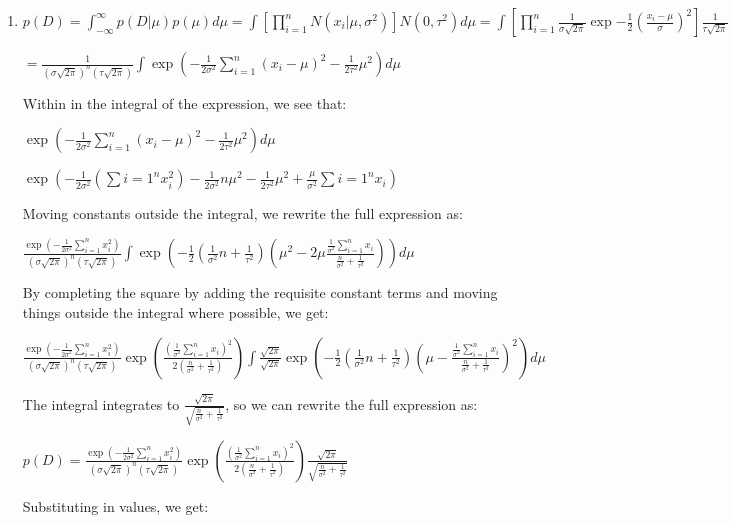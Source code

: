 \documentclass[submit]{harvardml}
\begin{document}
\begin{enumerate}
    \item 
    
    $p(D) = \int_{-\infty}^{\infty} p(D|\mu)p(\mu) d\mu = \int [\prod_{i=1}^n N(x_i | \mu, \sigma^2)]N(0, \tau^2)d\mu = \int[\prod_{i=1}^n \frac{1}{\sigma\sqrt{2\pi}}\exp{-\frac{1}{2}(\frac{x_i-\mu}{\sigma})^2}] \frac{1}{\tau\sqrt{2\pi}} \exp{-\frac{1}{2}(\frac{\mu}{\tau})^2}d\mu$
    
    $= \frac{1}{(\sigma\sqrt{2\pi})^n(\tau\sqrt{2\pi})}\int \exp(-\frac{1}{2\sigma^2}\sum_{i=1}^n (x_i - \mu)^2 - \frac{1}{2\tau^2}\mu^2)d\mu$
    
    Within in the integral of the expression, we see that:
    
    $\exp(-\frac{1}{2\sigma^2}\sum_{i=1}^n (x_i - \mu)^2 - \frac{1}{2\tau^2}\mu^2)d\mu $
    
    $\exp(-\frac{1}{2\sigma^2}(\sum{i=1}^n x_i^2) - \frac{1}{2\sigma^2}n\mu^2 - \frac{1}{2\tau^2}\mu^2 + \frac{\mu}{\sigma^2}\sum{i=1}^n x_i)$
    
    Moving constants outside the integral, we rewrite the full expression as:
    
    $\frac{\exp(-\frac{1}{2\sigma^2}\sum_{i=1}^n x_i^2)}{(\sigma\sqrt{2\pi})^n(\tau\sqrt{2\pi})}\int \exp(-\frac{1}{2}(\frac{1}{\sigma^2}n + \frac{1}{\tau^2})(\mu^2 - 2\mu\frac{\frac{1}{\sigma^2}\sum_{i=1}^n x_i}{\frac{n}{\sigma^2} + \frac{1}{\tau^2}})) d\mu$
    
    By completing the square by adding the requisite constant terms and moving things outside the integral where possible, we get:
    
    $\frac{\exp(-\frac{1}{2\sigma^2}\sum_{i=1}^n x_i^2)}{(\sigma\sqrt{2\pi})^n(\tau\sqrt{2\pi})}\exp(\frac{(\frac{1}{\sigma^2}\sum_{i=1}^n x_i)^2}{2(\frac{n}{\sigma^2} + \frac{1}{\tau^2})}) \int \frac{\sqrt{2\pi}}{\sqrt{2\pi}} \exp(-\frac{1}{2}(\frac{1}{\sigma^2}n + \frac{1}{\tau^2})(\mu - \frac{\frac{1}{\sigma^2}\sum_{i=1}^n x_i}{\frac{n}{\sigma^2} + \frac{1}{\tau^2}})^2) d\mu$
    
    The integral integrates to $\frac{\sqrt{2\pi}}{\sqrt{\frac{n}{\sigma^2} + \frac{1}{\tau^2}}}$, so we can rewrite the full expression as:
    
    $p(D) = \frac{\exp(-\frac{1}{2\sigma^2}\sum_{i=1}^n x_i^2)}{(\sigma\sqrt{2\pi})^n(\tau\sqrt{2\pi})}\exp(\frac{(\frac{1}{\sigma^2}\sum_{i=1}^n x_i)^2}{2(\frac{n}{\sigma^2} + \frac{1}{\tau^2})})\frac{\sqrt{2\pi}}{\sqrt{\frac{n}{\sigma^2} + \frac{1}{\tau^2}}}$
    
    Substituting in values, we get:
    

\end{enumerate}
\end{document}
